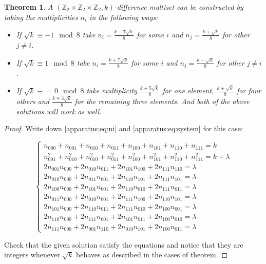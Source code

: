 \documentclass{article}
\theoremstyle{plain}
\newtheorem{theorem}{Theorem}[section]
\theoremstyle{definition}
\theoremstyle{remark}
\begin{document}
			\begin{theorem}
				A $(\mathbb Z_2 \times \mathbb Z_2 \times \mathbb Z_2, k)$-difference multiset can be constructed by taking the multiplicities $n_i$ in the following ways:
				\begin{itemize}
					\item If $\sqrt k \equiv -1 \mod 8$ take $n_i=\frac{k-7\sqrt k}8$ for some $i$ and $n_j=\frac{k+\sqrt k}8$ for other $j\neq i$.
					\item If $\sqrt k \equiv 1 \mod 8$ take $n_i=\frac{k+7\sqrt k}8$ for some $i$ and $n_j=\frac{k-\sqrt k}8$ for other $j\neq i$.
					\item If $\sqrt k \equiv = 0 \mod 8$ take multiplicity $\frac{k \pm 5\sqrt k}8$ for one element, $\frac{k \pm \sqrt k}8$ for four others and $\frac{k \mp 3\sqrt k}8$ for the remaining three elements. And both of the above solutions will work as well.
				\end{itemize}
			\end{theorem}
			
			\begin{proof}
				Write down \eqref{apparatus:eq:ni} and \eqref{apparatus:eq:system} for this case:
				
				\begin{equation}
					\begin{cases}
						n_{000} + n_{001} + n_{010} + n_{011} + n_{100}  + n_{101}  + n_{110}  + n_{111} = k \\
						n_{001}^2 + n_{010}^2 + n_{010}^2 + n_{011}^2 + n_{100}^2  + n_{101}^2  + n_{110}^2  + n_{111}^2 = k + \lambda \\
						2 n_{001} n_{000} + 2 n_{010} n_{011} + 2 n_{101} n_{100} +  2 n_{111} n_{110} = \lambda \\
						2 n_{010} n_{000} + 2 n_{011} n_{001} + 2 n_{110} n_{101} +  2 n_{111} n_{101} = \lambda \\
						2 n_{100} n_{000} + 2 n_{101} n_{001} + 2 n_{110} n_{010} +  2 n_{111} n_{011} = \lambda \\
						2 n_{011} n_{000} + 2 n_{010} n_{001} + 2 n_{111} n_{100} +  2 n_{110} n_{101} = \lambda \\
						2 n_{101} n_{000} + 2 n_{110} n_{011} + 2 n_{111} n_{010} +  2 n_{100} n_{001} = \lambda \\
						2 n_{110} n_{000} + 2 n_{111} n_{001} + 2 n_{101} n_{011} +  2 n_{100} n_{010} = \lambda \\
						2 n_{111} n_{000} + 2 n_{001} n_{110} + 2 n_{010} n_{101} +  2 n_{100} n_{011} = \lambda
					\end{cases}
				\end{equation}
				
				Check that the given solution satisfy the equations and notice that they are integers whenever $\sqrt k$ behaves as described in the cases of theorem.
			\end{proof}
			
\end{document}
